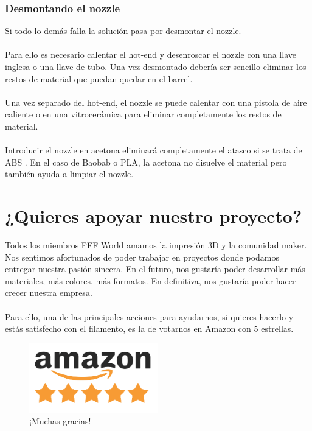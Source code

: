 \documentclass[11pt,a4paper]{article}
\begin{document}
	\subsubsection{Desmontando el nozzle}
Si todo lo demás falla la solución pasa por desmontar el nozzle.\\\\
Para ello es necesario calentar el hot-end y desenroscar el nozzle con una llave inglesa o una llave de tubo. Una vez desmontado debería ser sencillo eliminar los restos de material que puedan quedar en el barrel.\\\\
Una vez separado del hot-end, el nozzle se puede calentar con una pistola de aire caliente o en una vitrocerámica para eliminar completamente los restos de material.\\\\
Introducir el nozzle en acetona eliminará completamente el atasco si se trata de ABS . En el caso de Baobab o PLA, la acetona no disuelve el material pero también ayuda a limpiar el nozzle.\section{¿Quieres apoyar nuestro proyecto?}
Todos los miembros FFF World amamos la impresión 3D y la comunidad maker. Nos sentimos afortunados de poder trabajar en proyectos donde podamos entregar nuestra pasión sincera. En el futuro, nos gustaría poder desarrollar más materiales, más colores, más formatos. En definitiva, nos gustaría poder hacer crecer nuestra empresa.\\\\
Para ello, una de las principales acciones para ayudarnos, si quieres hacerlo y estás satisfecho con el filamento, es la de votarnos en Amazon con 5 estrellas.\begin{figure}[H]
\centering
\includegraphics[width=0.5\textwidth,cfbox=azul_marcos 1pt 0pt]{FOTOS/AMAZON_FIVE_STARS}
\caption*{¡Muchas gracias!}
\end{figure}
\end{document}
